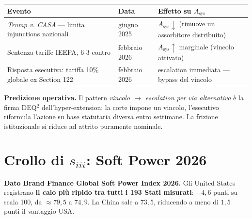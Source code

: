 {\def\LTcaptype{none} %
{\small\begin{longtable}[]{@{}
  >{\raggedright\arraybackslash}p{}
  >{\raggedright\arraybackslash}p{}
  >{\raggedright\arraybackslash}p{}@{}}
\toprule\noalign{}
\begin{minipage}[b]{\linewidth}\raggedright
Evento
\end{minipage} & \begin{minipage}[b]{\linewidth}\raggedright
Data
\end{minipage} & \begin{minipage}[b]{\linewidth}\raggedright
Effetto su \(A_{\text{sys}}\)
\end{minipage} \\
\midrule\noalign{}
\endhead
\bottomrule\noalign{}
\endlastfoot
\emph{Trump v. CASA} --- limita injunctions nazionali & 27 giugno 2025 &
\(A_{\text{sys}} \downarrow\) (rimuove un assorbitore distribuito) \\
Sentenza tariffe IEEPA, 6-3 contro & 20 febbraio 2026 &
\(A_{\text{sys}} \uparrow\) marginale (vincolo attivato) \\
Risposta esecutiva: tariffa 10\% globale ex Section 122 & febbraio 2026
& escalation immediata --- bypass del vincolo \\
\end{longtable}}
}

\Conj{} \textbf{Predizione operativa.} Il pattern \emph{vincolo \(\to\)
escalation per via alternativa} è la firma DEQ$^2$ dell'hyper-extension: la
corte impone un vincolo, l'esecutivo riformula l'azione su base
statutaria diversa entro settimane. La frizione istituzionale si riduce
ad attrito puramente nominale.



\section{\texorpdfstring{Crollo di \(s_{iii}\): Soft Power
2026}{Crollo di s\_\{iii\}: Soft Power 2026}}\label{crollo-di-s_iii-soft-power-2026}

\Proved{} \textbf{Dato Brand Finance Global Soft Power Index 2026.} Gli
United States registrano \textbf{il calo più ripido tra tutti i 193 Stati
misurati}: \(-4{,}6\) punti su scala 100, da \(\approx 79{,}5\) a
\(74{,}9\). La China sale a \(73{,}5\), riducendo a meno di \(1{,}5\)
punti il vantaggio USA.

